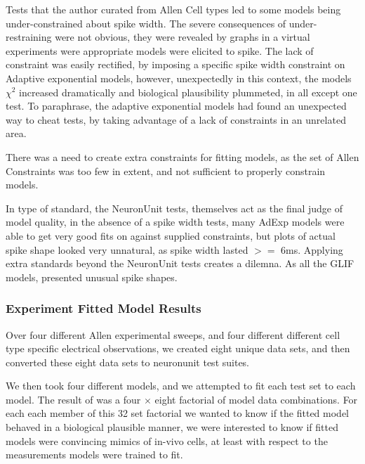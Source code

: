 

Tests that the author curated from Allen Cell types led to some models being under-constrained about spike width. The severe consequences of under-restraining were not obvious, they were revealed by graphs in a virtual experiments were appropriate models were elicited to spike. The lack of constraint was easily rectified, by imposing a specific spike width constraint on Adaptive exponential models, however, unexpectedly in this context, the models $\chi^{2}$ increased dramatically and biological plausibility plummeted, in all except one test. To  paraphrase, the adaptive exponential models had found an unexpected way to cheat tests, by taking advantage of a lack of constraints in an unrelated area.



There was a need to create extra constraints for fitting models, as the set of Allen Constraints was too few in extent, and not sufficient to properly constrain models.



In type of standard, the NeuronUnit tests, themselves act as the final judge of model quality, in the absence of a spike width tests, many AdExp models were able to get very good fits on against supplied constraints, but plots of actual spike shape looked very unnatural, as spike width lasted $>=$ 6ms. Applying extra standards beyond the NeuronUnit tests creates a dilemna. As all the GLIF models, presented unusual spike shapes.


\subsubsection{Experiment Fitted Model Results} 


Over four different Allen experimental sweeps, and four different different cell type specific electrical observations, we created eight unique data sets, and then converted these eight data sets to neuronunit test suites.

We then took four different models, and we attempted to fit each test set to each model. The result of was a four $\times $ eight factorial of model data combinations. For each each member of this 32 set factorial we wanted to know if the fitted model behaved in a biological plausible manner, we were interested to know if fitted models were convincing mimics of in-vivo cells, at least with respect to the measurements models were trained to fit.


